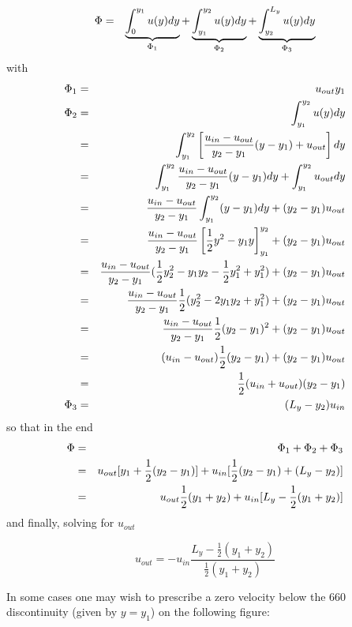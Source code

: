 \begin{eqnarray}
\Phi
&=&
\underbrace{\int_{0}^{y_1} u(y) dy}_{\Phi_1}  +
\underbrace{\int_{y_1}^{y_2} u(y) dy }_{\Phi_2}  +
\underbrace{\int_{y_2}^{L_y} u(y) dy }_{\Phi_3}\nonumber
\end{eqnarray}
with
\begin{eqnarray}
\Phi_1 &=& u_{out} y_1 \nonumber\\
\Phi_2 
&=& \int_{y_1}^{y_2} u(y) dy \nonumber\\
&=& \int_{y_1}^{y_2} \left[ \frac{u_{in}-u_{out}}{y_2-y_1}(y-y_1) + u_{out}   \right] dy \nonumber\\
&=& \int_{y_1}^{y_2} \frac{u_{in}-u_{out}}{y_2-y_1}(y-y_1)  dy  +   \int_{y_1}^{y_2}  u_{out} dy \nonumber\\
&=& \frac{u_{in}-u_{out}}{y_2-y_1} \int_{y_1}^{y_2} (y-y_1)  dy  +   (y_2-y_1) u_{out}  \nonumber\\
&=& \frac{u_{in}-u_{out}}{y_2-y_1} \left[ \frac12 y^2 - y_1y   \right]_{y_1}^{y_2} +   (y_2-y_1) u_{out}  \nonumber\\
&=& \frac{u_{in}-u_{out}}{y_2-y_1} ( \frac12 y_2^2 - y_1y_2 - \frac12y_1^2 + y_1^2 ) +   (y_2-y_1) u_{out}  \nonumber\\
&=& \frac{u_{in}-u_{out}}{y_2-y_1} \frac12 ( y_2^2 - 2y_1y_2 + y_1^2 ) +   (y_2-y_1) u_{out}  \nonumber\\
&=& \frac{u_{in}-u_{out}}{y_2-y_1} \frac12 ( y_2-y_1 )^2 +   (y_2-y_1) u_{out}  \nonumber\\
&=& (u_{in}-u_{out}) \frac12 ( y_2-y_1 ) +   (y_2-y_1) u_{out}  \nonumber\\
&=& \frac{1}{2}(u_{in}+u_{out})(y_2-y_1)  \nonumber\\
\Phi_3 &=& (L_y-y_2) u_{in} \nonumber
\end{eqnarray}
so that in the end
\begin{eqnarray}
\Phi &=& \Phi_1+\Phi_2+\Phi_3 \nonumber\\
&=& u_{out} [y_1 + \frac{1}{2}(y_2-y_1) ] + u_{in} [ \frac{1}{2}(y_2-y_1)  + (L_y-y_2) ] \nonumber\\
&=& u_{out}\frac{1}{2} (y_1 + y_2 ) + u_{in} [ L_y - \frac{1}{2}(y_1+y_2) ] \nonumber
\end{eqnarray}
and finally, solving for $u_{out}$
\begin{mdframed}[backgroundcolor=blue!5]
\[
u_{out} = -u_{in} \frac{ L_y - \frac{1}{2}(y_1+y_2)}{ \frac{1}{2} (y_1 + y_2 ) }
\]
\end{mdframed}


In some cases one may wish to prescribe a zero velocity 
below the 660 discontinuity (given by $y=y_1$) on the following 
figure:

